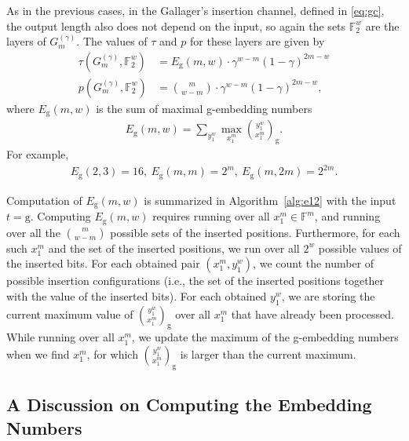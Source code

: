 \documentclass[journal, twocol]{IEEEtran}
\newcommand{\Eg}{{E_{\text{g}}}}
\newcommand{\dlbinom}[2]{{\binom{#1}{#2}_{\!\text{d}}}}
\newcommand{\gbinom}[2]{{\binom{#1}{#2}_{\!\text{g}}}}
\newcommand{\bF}{{\mathbb{F}}}
\begin{document}
As in the previous cases, in the Gallager's insertion channel, defined in \eqref{eq:gc}, the output length also does not depend on the input, so again the sets $\bF_2^w$ are the layers of $G^{(\gamma)}_m$.
The values of $\tau$ and $p$ for these layers are given by
\begin{align}
\tau(G^{(\gamma)}_m, \bF_2^w)&= \Eg(m,w) \cdot \gamma^{w-m}(1-\gamma)^{2m-w}
\label{eq:tauG}
\\
p(G^{(\gamma)}_m, \bF_2^w)&=\binom{m}{w-m}\cdot \gamma^{w-m}(1-\gamma)^{2m-w},
\label{eq:pG}
\end{align}
where $\Eg(m,w)$ is the sum of maximal g-embedding numbers 
\begin{align}
\Eg(m,w)=\sum_{y_1^w} \max_{x_1^m} \gbinom{y_1^w}{x_1^m}.
\label{eq:E2wm}
\end{align}
For example, 
\begin{gather}
\Eg(2,3)=16,\ \Eg(m,m)=2^m,\ \Eg(m,2m)=2^{2m}.
\label{eq:e2example}
\end{gather}

Computation of $\Eg(m,w)$ is summarized in Algorithm~\ref{alg:e12} with the input $t=\text{g}$.
Computing $\Eg(m,w)$ requires running over all $x_1^m\in \bF^m$, and running over all the $\binom{m}{w-m}$ possible sets of the inserted positions.
Furthermore, for each such $x_1^m$ and the set of the inserted positions, we run over all $2^w$ possible values of the inserted bits.
For each obtained pair $(x_1^m,y_1^w)$, we count the number of possible insertion configurations (i.e., the set of the inserted positions together with the value of the inserted bits).
For each obtained $y_1^w$, we are storing the current maximum value of $\gbinom{y_1^w}{x_1^m}$ over all $x_1^m$ that have already been processed.
While running over all $x_1^m$, we update the maximum of the g-embedding numbers when we find $x_1^m$, for which $\gbinom{y_1^w}{x_1^m}$ is larger than the current maximum.


\subsection{A Discussion on Computing the Embedding Numbers}
\end{document}

